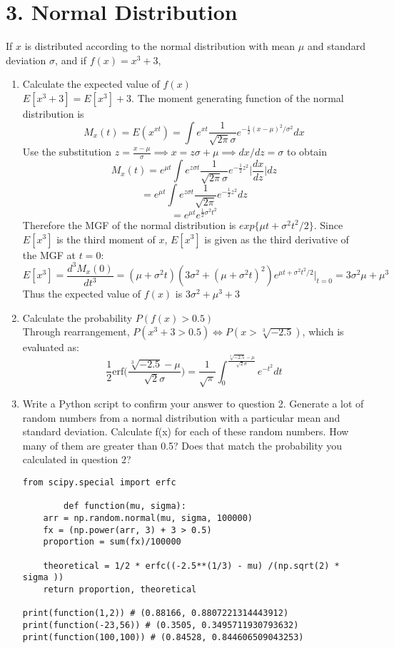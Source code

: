 \documentclass[11pt]{report}
\begin{document}
\section*{3. Normal Distribution}
If $x$ is distributed according to the normal distribution with mean $\mu$ and standard deviation $\sigma$, and if $f(x) = x^3 + 3$,
\begin{enumerate}
	\item Calculate the expected value of $f(x)$ \\ $E[x^3 + 3] = E[x^3] + 3$. The moment generating function of the normal distribution is $$ M_x(t) = E(x^{xt}) = \int e^{xt} \frac{1}{\sqrt{2\pi}\sigma}e^{-\frac{1}{2}(x-\mu)^2/\sigma^2} dx$$ Use the substitution $z = \frac{x-\mu}{\sigma} \implies x = z\sigma + \mu \implies dx/dz = \sigma $ to obtain $$M_x(t) = e^{\mu t}\int e^{z \sigma t} \frac{1}{\sqrt{2 \pi }\sigma }e^{-\frac{1}{2}z^2} \bigg| \frac{dx}{dz} \bigg| dz $$ $$ = e^{\mu t} \int e^{z \sigma t} \frac{1}{\sqrt{2\pi}}e^{- \frac{1}{2} z^2}dz $$ $$  = e^{\mu t}e^{\frac{1}{2}\sigma^2 t^2}$$ Therefore the MGF of the normal distribution is $exp \{\mu t  + \sigma^2 t^2 /2\} $. Since $E[x^3]$ is the third moment of $x$, $E[x^3]$ is given as the third derivative of the MGF at $t = 0:$ $$E[x^3] =  \frac{d^3 M_x(0)}{dt^3} = (\mu + \sigma^2 t)(3 \sigma^2 + (\mu + \sigma^2 t)^2)e^{\mu t +  \sigma^2 t^2 /2} \bigg|_{t=0} = 3\sigma^2 \mu + \mu^3$$ Thus the expected value of $f(x)$ is $3\sigma^2 + \mu^3 + 3$
	\item Calculate the probability $P(f(x) > 0.5)$ \\ Through rearrangement, $P(x^3 + 3 > 0.5) \iff P(	x > \sqrt[3]{-2.5})$, which is evaluated as: $$\frac{1}{2}\text{erf}\bigg(\frac{ \sqrt[3]{-2.5} - \mu}{\sqrt{2}\sigma}\bigg) = \frac{1}{\sqrt{\pi}}\int_{0}^{\frac{ \sqrt[3]{-2.5} - \mu}{\sqrt{2}\sigma}}e^{-t^2}dt$$
	\item Write a Python script to confirm your answer to question 2. Generate a lot of random numbers from a normal distribution with a particular mean and standard deviation. Calculate f(x) for each of these random numbers. How many of them are greater than 0.5? Does that match the probability you calculated in question 2? \begin{verbatim}from scipy.special import erfc

		def function(mu, sigma):
    arr = np.random.normal(mu, sigma, 100000)
    fx = (np.power(arr, 3) + 3 > 0.5)
    proportion = sum(fx)/100000
    
    theoretical = 1/2 * erfc((-2.5**(1/3) - mu) /(np.sqrt(2) * sigma ))
    return proportion, theoretical

print(function(1,2)) # (0.88166, 0.8807221314443912)
print(function(-23,56)) # (0.3505, 0.3495711930793632)
print(function(100,100)) # (0.84528, 0.844606509043253)
	\end{verbatim}

\end{enumerate}
\end{document}
